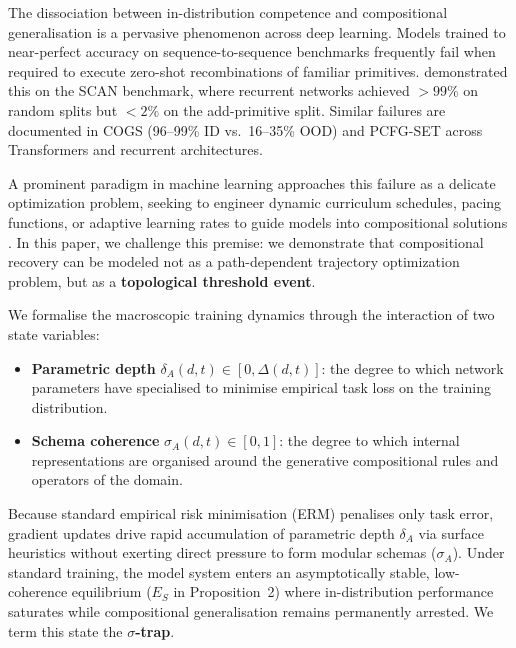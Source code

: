 \documentclass{article}
\theoremstyle{definition}
\begin{document}
The dissociation between in-distribution competence and compositional generalisation is a pervasive phenomenon across deep learning. Models trained to near-perfect accuracy on sequence-to-sequence benchmarks frequently fail when required to execute zero-shot recombinations of familiar primitives. \cite{lake2018generalizationwithoutsystematicity} demonstrated this on the SCAN benchmark, where recurrent networks achieved $>99\%$ on random splits but $<2\%$ on the add-primitive split. Similar failures are documented in COGS \citep{kim2020cogscompositionalgeneralizationchallenge} (96--99\% ID vs.\ 16--35\% OOD) and PCFG-SET \citep{hupkes2020compositionalitydecomposed} across Transformers and recurrent architectures.

A prominent paradigm in machine learning approaches this failure as a delicate optimization problem, seeking to engineer dynamic curriculum schedules, pacing functions, or adaptive learning rates to guide models into compositional solutions \citep{bengio2009curriculumlearning,kumar2010selfpacedlearning,jiang2022mutualexclusivity}. In this paper, we challenge this premise: we demonstrate that compositional recovery can be modeled not as a path-dependent trajectory optimization problem, but as a \textbf{topological threshold event}.

We formalise the macroscopic training dynamics through the interaction of two state variables:
\begin{itemize}[nosep]
\item \textbf{Parametric depth} $\delta_A(d,t) \in [0, \Delta(d,t)]$: the degree to which network parameters have specialised to minimise empirical task loss on the training distribution.
\item \textbf{Schema coherence} $\sigma_A(d,t) \in [0,1]$: the degree to which internal representations are organised around the generative compositional rules and operators of the domain.
\end{itemize}

Because standard empirical risk minimisation (ERM) penalises only task error, gradient updates drive rapid accumulation of parametric depth $\delta_A$ via surface heuristics without exerting direct pressure to form modular schemas ($\sigma_A$). Under standard training, the model system enters an asymptotically stable, low-coherence equilibrium ($E_S$ in Proposition~2) where in-distribution performance saturates while compositional generalisation remains permanently arrested. We term this state the \textbf{$\sigma$-trap}.
\end{document}
